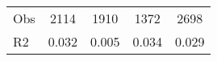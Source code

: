 \begin{tabular}{l*{4}{c}}
\hline                                                                                                                                                                                                                                            
 Obs                   &               2114               &       1910                       &       1372                &              2698                                               \\ 
 R2                    &                      0.032              &              0.005                      &              0.034               &                     0.029                                              \\ 
\hline \end{tabular}                                                                                                                                                                                                              